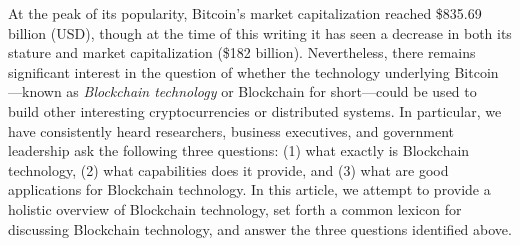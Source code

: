 At the peak of its popularity, Bitcoin's market capitalization reached \$835.69 billion (USD), though at the time of this writing it has seen a decrease in both its stature and market capitalization (\$182 billion).
Nevertheless, there remains significant interest in the question of whether the technology underlying Bitcoin---known as \emph{Blockchain technology} or {Blockchain} for short---could be used to build other interesting cryptocurrencies or distributed systems.
In particular, we have consistently heard researchers, business executives, and government leadership ask the following three questions: (1) what exactly is Blockchain technology, (2) what capabilities does it provide, and (3) what are good applications for Blockchain technology.%
%
In this article, 
we attempt to provide a holistic overview of Blockchain technology, set forth a common lexicon for discussing Blockchain technology, and answer the three questions identified above.

%	
%
%	

